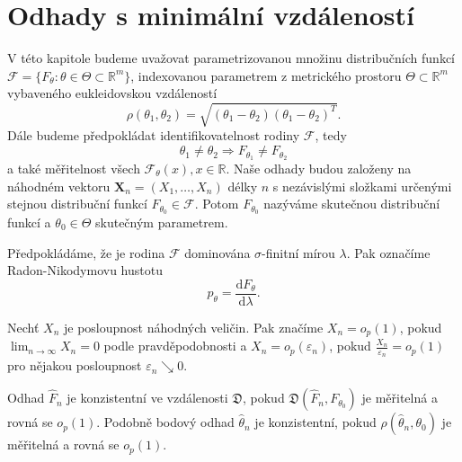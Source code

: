 \chapter{Odhady s minimální vzdáleností}

V této kapitole budeme uvažovat parametrizovanou množinu distribučních funkcí $\mathcal{F} = \lbrace F_\theta : \theta \in \Theta \subset \mathbb{R}^m \rbrace$, indexovanou parametrem z metrického prostoru $\Theta \subset \mathbb{R}^m$ vybaveného eukleidovskou vzdáleností 
\begin{equation}
	\rho (\theta_1,\theta_2) = \sqrt{(\theta_1-\theta_2)(\theta_1-\theta_2)^T}. 
\end{equation}
Dále budeme předpokládat identifikovatelnost rodiny $\mathcal{F}$, tedy 
\begin{equation}
\theta_1 \neq \theta_2 \Rightarrow F_{\theta_1} \neq F_{\theta_2}
\end{equation}
a také měřitelnost všech $\mathcal{F}_\theta(x), x \in \mathbb{R}$. Naše odhady budou založeny na náhodném vektoru $\mathbf{X}_n = (X_1, \ldots ,X_n)$ délky $n$ s nezávislými složkami určenými stejnou distribuční funkcí $F_{\theta_0} \in \mathcal{F}$. Potom $F_{\theta_0}$ nazýváme skutečnou distribuční funkcí a $\theta_0 \in \Theta$ skutečným parametrem. 

Předpokládáme, že je rodina $\mathcal{F}$ dominována $\sigma$-finitní mírou $\lambda$. Pak označíme Radon-Nikodymovu hustotu 
\begin{equation}
p_\theta = \dfrac{\mathrm{d} F_\theta}{\mathrm{d} \lambda}.
\end{equation}



\begin{definition}
	Nech\v{t} $X_n$ je posloupnost náhodných veličin. Pak značíme $X_n = o_p(1)$, pokud $\lim_{n \rightarrow \infty } X_n = 0$ podle pravděpodobnosti a $X_n = o_p(\varepsilon_n)$, pokud $\frac{X_n}{\varepsilon_n} = o_p(1)$ pro nějakou posloupnost $\varepsilon_n \searrow 0$.
\end{definition} 

\begin{definition}
Odhad $\hat{F}_n$ je konzistentní ve vzdálenosti $\mathfrak{D}$, pokud $\mathfrak{D}(\hat{F}_n, F_{\theta_0})$ je měřitelná a rovná se $o_p (1)$. Podobně bodový odhad $\hat{\theta}_n$ je konzistentní, pokud $\rho(\hat{\theta}_n,\theta_0)$ je měřitelná a rovná se $o_p (1)$. 
\end{definition}

